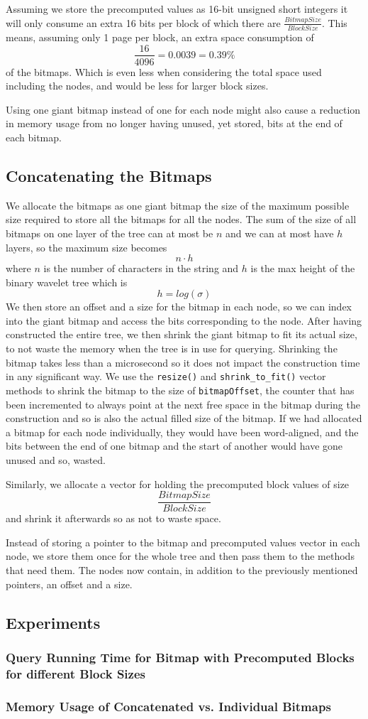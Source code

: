Assuming we store the precomputed values as 16-bit unsigned short integers it will only consume an extra 16 bits per block of which there are $\frac{BitmapSize}{BlockSize}$.
This means, assuming only 1 page per block, an extra space consumption of
\[ \frac{16}{4096} = 0.0039 = 0.39\% \]
of the bitmaps.
Which is even less when considering the total space used including the nodes, and would be less for larger block sizes.

Using one giant bitmap instead of one for each node might also cause a reduction in memory usage from no longer having unused, yet stored, bits at the end of each bitmap.




\subsection{Concatenating the Bitmaps}
We allocate the bitmaps as one giant bitmap the size of the maximum possible size required to store all the bitmaps for all the nodes. The sum of the size of all bitmaps on one layer of the tree can at most be $n$ and we can at most have $h$ layers, so the maximum size becomes
\[n \cdot h\]
where $n$ is the number of characters in the string and $h$ is the max height of the binary wavelet tree which is
\[ h = log(\sigma) \]
We then store an offset and a size for the bitmap in each node, so we can index into the giant bitmap and access the bits corresponding to the node.
After having constructed the entire tree, we then shrink the giant bitmap to fit its actual size, to not waste the memory when the tree is in use for querying. Shrinking the bitmap takes less than a microsecond so it does not impact the construction time in any significant way. We use the \texttt{resize()} and \texttt{shrink\_to\_fit()} vector methods to shrink the bitmap to the size of \texttt{bitmapOffset}, the counter that has been incremented to always point at the next free space in the bitmap during the construction and so is also the actual filled size of the bitmap.
If we had allocated a bitmap for each node individually, they would have been word-aligned, and the bits between the end of one bitmap and the start of another would have gone unused and so, wasted.

Similarly, we allocate a vector for holding the precomputed block values of size
\[ \frac{BitmapSize}{BlockSize} \]
and shrink it afterwards so as not to waste space.

Instead of storing a pointer to the bitmap and precomputed values vector in each node, we store them once for the whole tree and then pass them to the methods that need them.
The nodes now contain, in addition to the previously mentioned pointers, an offset and a size.

\subsection{Experiments}
\subsubsection{Query Running Time for Bitmap with Precomputed Blocks for different Block Sizes}

\subsubsection{Memory Usage of Concatenated vs. Individual Bitmaps}